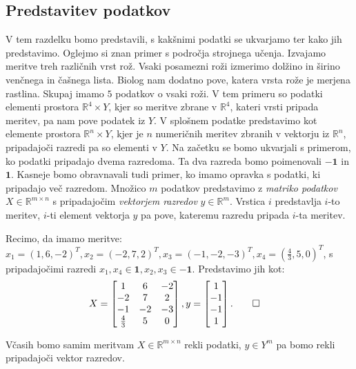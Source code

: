 \documentclass[mat1]{fmfdelo}
\newcommand{\R}{\mathbb R}
\newcommand{\pr}{\mathbf 1}
\newcommand{\nr}{\mathbf {-1}}
\begin{document}
\subsection{Predstavitev podatkov}
V tem razdelku bomo predstavili, s kakšnimi podatki se ukvarjamo ter kako jih predstavimo. 
Oglejmo si znan primer s področja strojnega učenja. Izvajamo meritve treh različnih vrst rož. Vsaki posamezni roži izmerimo dolžino in širino venčnega in čašnega lista. Biolog nam dodatno pove, katera vrsta rože je merjena rastlina. Skupaj imamo $5$ podatkov o vsaki roži. V tem primeru so podatki elementi prostora $\R^4 \times Y$, kjer so meritve zbrane v $\R^4$, kateri vrsti pripada meritev, pa nam pove podatek iz $Y$. V splošnem podatke predstavimo kot elemente prostora $\R^n \times Y$, kjer je $n$ numeričnih meritev zbranih v vektorju iz $\R^n$, pripadajoči razredi pa so elementi v $Y$. Na začetku se bomo ukvarjali s primerom, ko podatki pripadajo dvema razredoma. Ta dva razreda bomo poimenovali $\nr$ in $\pr$. Kasneje bomo obravnavali tudi primer, ko imamo opravka s podatki, ki pripadajo več razredom. Množico $m$ podatkov predstavimo z \emph{matriko podatkov} $X \in \R^{m \times n}$ s pripadajočim \emph{vektorjem razredov} $y \in \R^m$. Vrstica $i$ predstavlja $i$-to meritev, $i$-ti element vektorja $y$ pa pove, kateremu razredu pripada $i$-ta meritev. 
\begin{primer}
	Recimo, da imamo meritve: $x_1 = (1,6,-2)^T, x_2 = (-2, 7, 2)^T, x_3 = (-1,-2,-3)^T, x_4 = (\frac{4}{3}, 5, 0)^T$, s pripadajočimi razredi $x_1, x_4 \in \pr, x_2, x_3 \in \nr$. Predstavimo jih kot: 
	\begin{align*} X =  
	\begin{bmatrix}
	1 & 6 & -2  \\
	-2 & 7 &  2     \\
	-1 & -2 & -3  \\
	\frac{4}{3}& 5 & 0 
	\end{bmatrix}, y=\begin{bmatrix}
	1   \\
	-1    \\
	-1 \\
	1
	\end{bmatrix}. &\qedhere
	\end{align*}
\end{primer}

\begin{opomba}
	Včasih bomo samim meritvam $X \in \R^{m \times n}$ rekli podatki, $y \in Y^m$ pa bomo rekli pripadajoči vektor razredov. 
\end{opomba}
\end{document}
